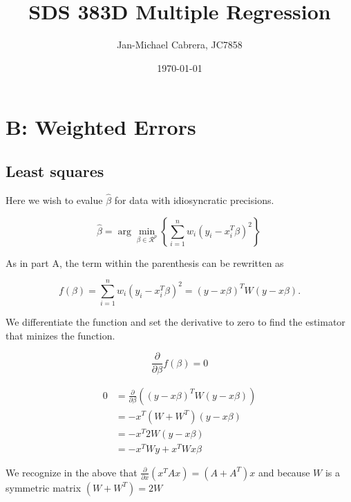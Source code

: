 \documentclass[12pt]{article}
\begin{document}
    \title{SDS 383D Multiple Regression}
    \author{Jan-Michael Cabrera, JC7858}
    \date{\today}
    \maketitle

    \section*{B: Weighted Errors}

        \subsection*{Least squares}

        Here we wish to evalue $\hat{\beta}$ for data with idiosyncratic precisions. 

        \begin{equation}
            \hat{\beta} = \arg \min_{\beta \in \mathcal{R}^p} \left\{  \sum_{i=1}^n w_i (y_i - x_i^T \beta)^2 \right\}  \,
        \end{equation}

        As in part A, the term within the parenthesis can be rewritten as

        \begin{equation}
            f(\beta) = \sum_{i=1}^n w_i (y_i - x_i^T \beta)^2 = (y - x\beta)^T W(y-x\beta).
        \end{equation}

        We differentiate the function and set the derivative to zero to find the estimator that minizes the function.

        \begin{equation}
            \frac{\partial}{\partial \beta}f(\beta) = 0
        \end{equation}

        \begin{align}
            0 &= \frac{\partial}{\partial \beta} \left ( (y - x\beta)^TW(y-x\beta) \right) \\
            & = -x^T (W + W^T)(y-x\beta)\\
            & = -x^T 2W (y-x\beta)\\
            & = -x^T W y + x^T W x \beta
        \end{align}

        We recognize in the above that $\frac{\partial}{\partial x} (x^T A x) = (A + A^T)x$ and because $W$ is a symmetric matrix $(W + W^T) = 2W$
\end{document}
